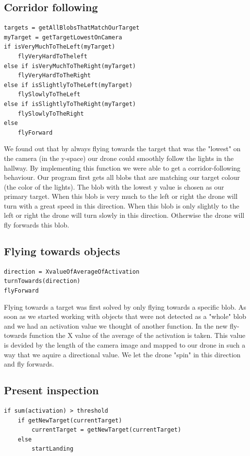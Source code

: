 \documentclass[a4paper,10pt]{article}
\begin{document}
\subsection{Corridor following} 
\begin{verbatim}
targets = getAllBlobsThatMatchOurTarget
myTarget = getTargetLowestOnCamera
if isVeryMuchToTheLeft(myTarget)
	flyVeryHardToTheleft
else if isVeryMuchToTheRight(myTarget)
	flyVeryHardToTheRight
else if isSlightlyToTheLeft(myTarget)
	flySlowlyToTheLeft
else if isSlightlyToTheRight(myTarget)
	flySlowlyToTheRight
else
	flyForward

\end{verbatim}

We found out that by always flying towards the target that was the "lowest" on the camera (in the y-space) our drone could smoothly follow the lights in the hallway. 
By implementing this function we were able to get a corridor-following behaviour. 
Our program first gets all blobs that are matching our target colour (the color of the lights). 
The blob with the lowest y value is chosen as our primary target. 
When this blob is very much to the left or right the drone will turn with a great speed in this direction. 
When this blob is only slightly to the left or right the drone will turn slowly in this direction. 
Otherwise the drone will fly forwards this blob. 

\subsection{Flying towards objects}
\begin{verbatim}
direction = XvalueOfAverageOfActivation
turnTowards(direction)
flyForward
\end{verbatim}

Flying towards a target was first solved by only flying towards a specific blob. 
As soon as we started working with objects that were not detected as a "whole" blob and we had an activation value we thought of another function. 
In the new fly-towards function the X value of the average of the activation is taken.
This value is devided by the length of the camera image and mapped to our drone in such a way that we aquire a directional value. 
We let the drone "spin" in this direction and fly forwards. 

\subsection{Present inspection}
\begin{verbatim}
if sum(activation) > threshold
	if getNewTarget(currentTarget)
		currentTarget = getNewTarget(currentTarget)
	else
		startLanding
\end{verbatim}
\end{document}
